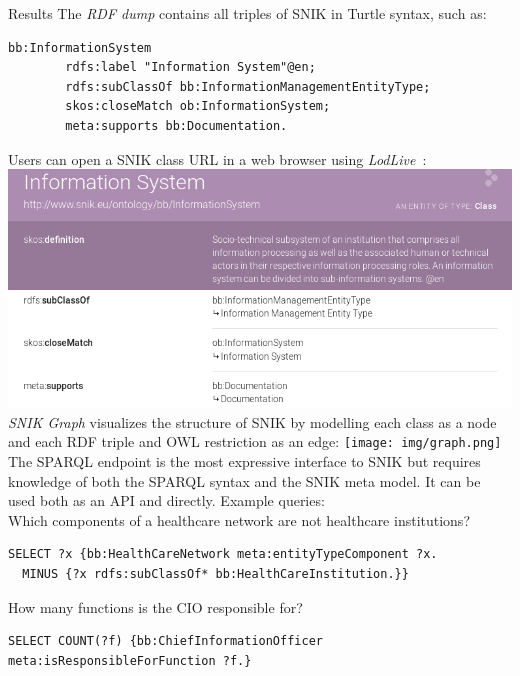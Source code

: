 \documentclass[portrait,final,a0paper,fontscale=0.310]{baposter}
\begin{document}
\begin{poster}
\begin{posterbox}[name=results,column=1]{Results}
The \emph{RDF dump} contains all triples of SNIK in Turtle syntax, such as:
\begin{lstlisting}[basicstyle=\ttfamily]
bb:InformationSystem
        rdfs:label "Information System"@en;
        rdfs:subClassOf bb:InformationManagementEntityType;
        skos:closeMatch ob:InformationSystem;
        meta:supports bb:Documentation.
\end{lstlisting}
Users can open a SNIK class URL in a web browser using \emph{LodLive}~\cite{lodlive}:
\includegraphics[width=\textwidth]{img/lodlive.png}
\emph{SNIK Graph} visualizes the structure of SNIK by modelling each class as a node and each RDF triple and OWL restriction as an edge:
\texttt{[image: img/graph.png]}
The SPARQL endpoint is the most expressive interface to SNIK but requires knowledge of both the SPARQL syntax and the SNIK meta model.
It can be used both as an API and directly.
Example queries:\\
Which components of a healthcare network are not healthcare institutions?
\begin{lstlisting}
SELECT ?x {bb:HealthCareNetwork meta:entityTypeComponent ?x.
  MINUS {?x rdfs:subClassOf* bb:HealthCareInstitution.}}
\end{lstlisting}
How many functions is the CIO responsible for?
\begin{lstlisting}
SELECT COUNT(?f) {bb:ChiefInformationOfficer meta:isResponsibleForFunction ?f.}
\end{lstlisting}


\end{posterbox}
\end{poster}
\end{document}
